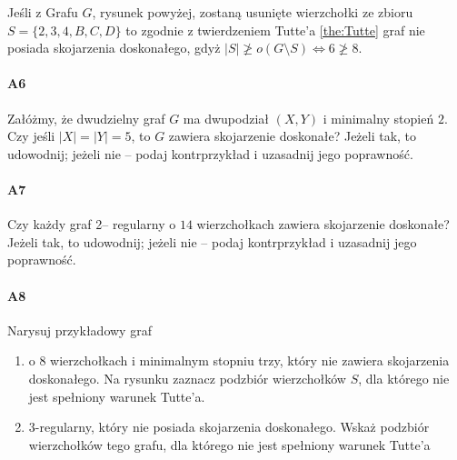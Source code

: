 \documentclass[a4paper,12pt]{article}
\theoremstyle{definition}%
\theoremstyle{definition}
\theoremstyle{problem}
\begin{document}
Jeśli z Grafu $G$, rysunek powyżej, zostaną usunięte wierzchołki ze zbioru $S=\{2,3,4,B,C,D\}$ to zgodnie z twierdzeniem Tutte'a \ref{the:Tutte} graf nie posiada skojarzenia doskonałego, gdyż $|S|\not \geq o(G\setminus S)\Leftrightarrow 6 \not \geq 8$.

\paragraph{A6} Załóżmy, że dwudzielny graf $G$ ma dwupodział $(X, Y )$ i minimalny stopień $2$. Czy jeśli $|X| = |Y | = 5$, to $G$ zawiera skojarzenie doskonałe? Jeżeli tak, to udowodnij; jeżeli nie – podaj kontrprzykład i uzasadnij jego poprawność.

\paragraph{A7} Czy każdy graf 2– regularny o $14$ wierzchołkach zawiera skojarzenie doskonałe? Jeżeli tak, to udowodnij; jeżeli nie – podaj kontrprzykład i uzasadnij jego poprawność.


\paragraph{A8}
Narysuj przykładowy graf
\begin{enumerate}[label=\alph*)]
\item o 8 wierzchołkach i minimalnym stopniu trzy, który nie zawiera skojarzenia doskonałego. Na rysunku zaznacz podzbiór wierzchołków $S$, dla którego nie jest spełniony warunek Tutte'a.
\item 3-regularny, który nie posiada skojarzenia doskonałego. Wskaż podzbiór wierzchołków tego grafu, dla którego nie jest spełniony warunek Tutte'a
\end{enumerate}
\end{document}
